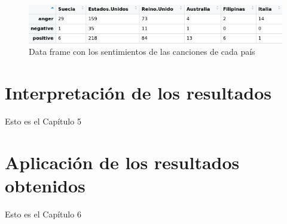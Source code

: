 \begin{figure}[h]
	\centering
	\includegraphics[width=0.7\linewidth]{Imagenes/sentimenttablebycountry}
	\caption{Data frame con los sentimientos de las canciones de cada país}
	\label{fig:sentimenttablebycountry}
\end{figure}

\section{Interpretación de los resultados}

Esto es el Capítulo 5

\section{Aplicación de los resultados obtenidos}

Esto es el Capítulo 6